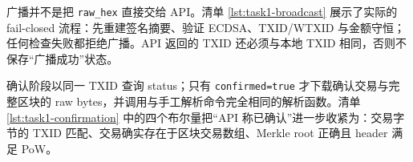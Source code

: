 \documentclass[11pt,a4paper,fontset=none]{ctexart}
\begin{document}
广播并不是把 \texttt{raw\_hex} 直接交给 API。清单 \ref{lst:task1-broadcast} 展示了实际的 fail-closed 流程：先重建签名摘要、验证 ECDSA、TXID/WTXID 与金额守恒；任何检查失败都拒绝广播。API 返回的 TXID 还必须与本地 TXID 相同，否则不保存“广播成功”状态。



确认阶段以同一 TXID 查询 status；只有 \texttt{confirmed=true} 才下载确认交易与完整区块的 raw bytes，并调用与手工解析命令完全相同的解析函数。清单 \ref{lst:task1-confirmation} 中的四个布尔量把“API 称已确认”进一步收紧为：交易字节的 TXID 匹配、交易确实存在于区块交易数组、Merkle root 正确且 header 满足 PoW。


\end{document}

